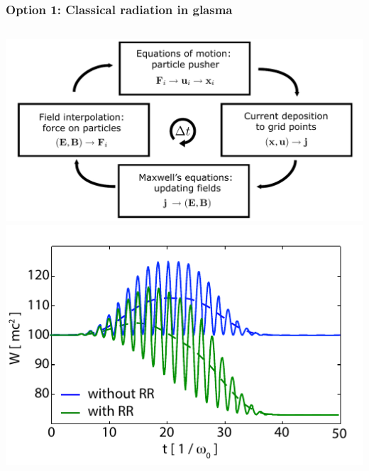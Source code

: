 \documentclass[aspectratio=169,11pt,usenames,dvipsnames]{beamer}
\begin{document}
\begin{frame}[noframenumbering]
    \frametitle{{\normalsize\color{jyured}\bfseries\sffamily Option 1: }Classical radiation in glasma}
    \vspace{-15pt}
    \begin{center}
        \begin{columns}[onlytextwidth,t]
            \vspace{5pt}
            \begin{center}
                \includegraphics[width=0.8\columnwidth]{images/Figure8.pdf}
                \\[1pt]
                \includegraphics[width=0.65\columnwidth]{images/Figure4.pdf}
            \end{center}


\end{columns}
\end{center}
\end{frame}
\end{document}
